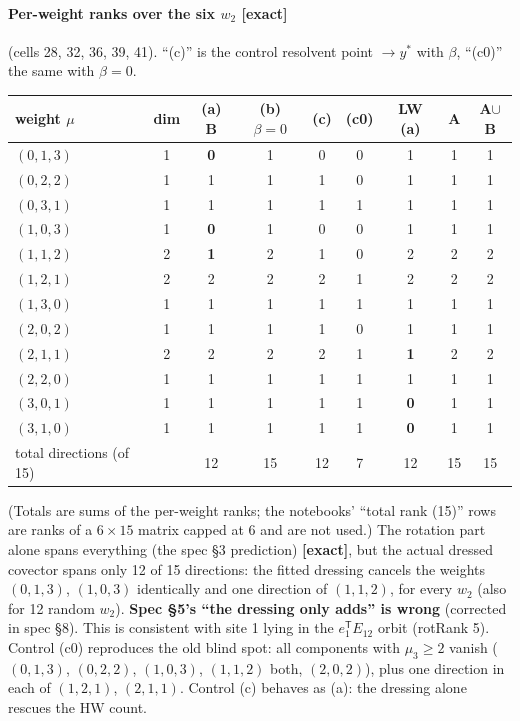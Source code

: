 \documentclass[11pt]{article}
\newcommand{\eT}{e_1^{\mathsf T}}
\newcommand{\ex}{\textbf{[exact]}}
\begin{document}
\paragraph{Per-weight ranks over the six $w_2$ \ex} (cells 28, 32, 36, 39, 41). ``(c)'' is the control resolvent point $\to y^*$ with $\beta$, ``(c0)'' the same with $\beta=0$.
\begin{center}\small
\begin{tabular}{@{}lcccccccc@{}}\toprule
weight $\mu$ & dim & (a) B & (b) $\beta{=}0$ & (c) & (c0) & LW (a) & A & A$\cup$B\\\midrule
$(0,1,3)$&1&\textbf{0}&1&0&0&1&1&1\\
$(0,2,2)$&1&1&1&1&0&1&1&1\\
$(0,3,1)$&1&1&1&1&1&1&1&1\\
$(1,0,3)$&1&\textbf{0}&1&0&0&1&1&1\\
$(1,1,2)$&2&\textbf{1}&2&1&0&2&2&2\\
$(1,2,1)$&2&2&2&2&1&2&2&2\\
$(1,3,0)$&1&1&1&1&1&1&1&1\\
$(2,0,2)$&1&1&1&1&0&1&1&1\\
$(2,1,1)$&2&2&2&2&1&\textbf{1}&2&2\\
$(2,2,0)$&1&1&1&1&1&1&1&1\\
$(3,0,1)$&1&1&1&1&1&\textbf{0}&1&1\\
$(3,1,0)$&1&1&1&1&1&\textbf{0}&1&1\\\midrule
total directions (of 15)&&12&15&12&7&12&15&15\\\bottomrule
\end{tabular}
\end{center}
(Totals are sums of the per-weight ranks; the notebooks' ``total rank (15)'' rows are ranks of a $6\times15$ matrix capped at 6 and are not used.) The rotation part alone spans everything (the spec \S3 prediction) \ex, but the actual dressed covector spans only 12 of 15 directions: the fitted dressing cancels the weights $(0,1,3)$, $(1,0,3)$ identically and one direction of $(1,1,2)$, for every $w_2$ (also for 12 random $w_2$). \textbf{Spec \S5's ``the dressing only adds'' is wrong} (corrected in spec \S8). This is consistent with site 1 lying in the $\eT E_{12}$ orbit (rotRank 5). Control (c0) reproduces the old blind spot: all components with $\mu_3\ge2$ vanish ($(0,1,3)$, $(0,2,2)$, $(1,0,3)$, $(1,1,2)$ both, $(2,0,2)$), plus one direction in each of $(1,2,1)$, $(2,1,1)$. Control (c) behaves as (a): the dressing alone rescues the HW count.
\end{document}
